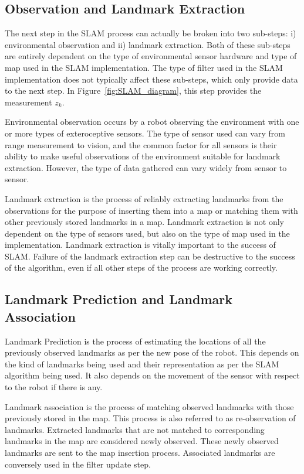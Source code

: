 \subsection{Observation and Landmark Extraction}
\label{sec:observation}
The next step in the SLAM process can actually be broken into two sub-steps: i) environmental observation and ii) landmark extraction. Both of these sub-steps are entirely dependent on the type of environmental sensor hardware and type of map used in the SLAM implementation. The type of filter used in the SLAM implementation does not typically affect these sub-steps, which only provide data to the next step. In Figure~\ref{fig:SLAM_diagram}, this step provides the measurement $ z_k $.

Environmental observation occurs by a robot observing the environment with one or more types of exteroceptive sensors. The type of sensor used can vary from range measurement to vision, and the common factor for all sensors is their ability to make useful observations of the environment suitable for landmark extraction. However, the type of data gathered can vary widely from sensor to sensor.

Landmark extraction is the process of reliably extracting landmarks from the observations for the purpose of inserting them into a map or matching them with other previously stored landmarks in a map. Landmark extraction is not only dependent on the type of sensors used, but also on the type of map used in the implementation. Landmark extraction is vitally important to the success of SLAM. Failure of the landmark extraction step can be destructive to the success of the algorithm, even if all other steps of the process are working correctly. 

\subsection{Landmark Prediction and Landmark Association}

Landmark Prediction is the process of estimating the locations of all the previously observed landmarks as per the new pose of the robot. This depends on the kind of landmarks being used and their representation as per the SLAM algorithm being used. It also depends on the movement of the sensor with respect to the robot if there is any.

Landmark association is the process of matching observed landmarks with those previously stored in the map. This process is also referred to as re-observation of landmarks. Extracted landmarks that are not matched to corresponding landmarks in the map are considered newly observed. These newly observed landmarks are sent to the map insertion process. Associated landmarks are conversely used in the filter update step. 

